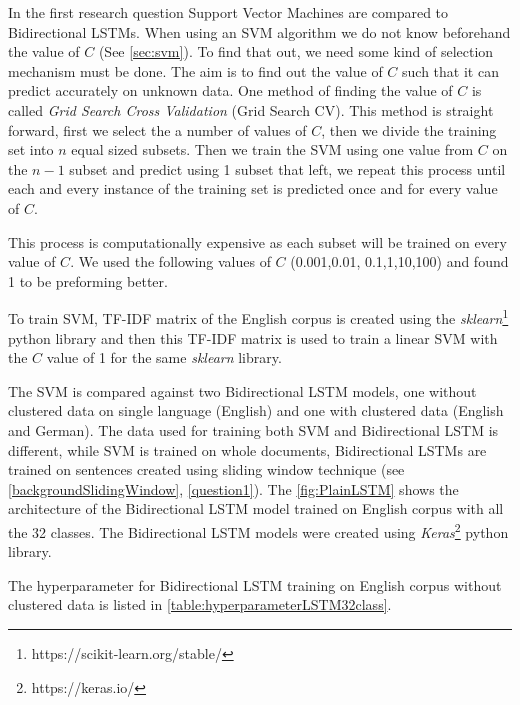 In the first research question Support Vector Machines are compared to Bidirectional LSTMs. When using an SVM algorithm we do not know beforehand the value of $C$ (See \ref{sec:svm}). To find that out, we need some kind of selection mechanism must be done. The aim is to find out the value of $C$ such that it can predict accurately on unknown data. One method of finding the value of $C$ is called \textit{Grid Search Cross Validation} (Grid Search CV). This method is straight forward, first we select the a number of values of $C$, then we divide the training set into $n$ equal sized subsets. Then we train the SVM using one value from $C$ on the $n-1$ subset and predict using 1 subset that left, we repeat this process until each and every instance of the training set is predicted once and for every value of $C$.

This process is computationally expensive as each subset will be trained on every value of $C$. We used the following values of $C$ (0.001,0.01, 0.1,1,10,100) and found 1 to be preforming better.

To train SVM, TF-IDF matrix of the English corpus is created using the \textit{sklearn}\footnote{https://scikit-learn.org/stable/} python library and then this TF-IDF matrix is used to train a linear SVM with the $C$ value of 1 for the same \textit{sklearn} library. 

The SVM is compared against two Bidirectional LSTM models, one without clustered data on single language (English) and one with clustered data (English and German). The data used for training both SVM and Bidirectional LSTM is different, while SVM is trained on whole documents, Bidirectional LSTMs are trained on sentences created using sliding window technique (see \ref{backgroundSlidingWindow}, \ref{question1}). The \ref{fig:PlainLSTM} shows the architecture of the Bidirectional LSTM model trained on English corpus with all the 32 classes. The Bidirectional LSTM models were created using \textit{Keras}\footnote{https://keras.io/} python library. 

The hyperparameter for Bidirectional LSTM training on English corpus without clustered data is listed in \ref{table:hyperparameterLSTM32class}. 


